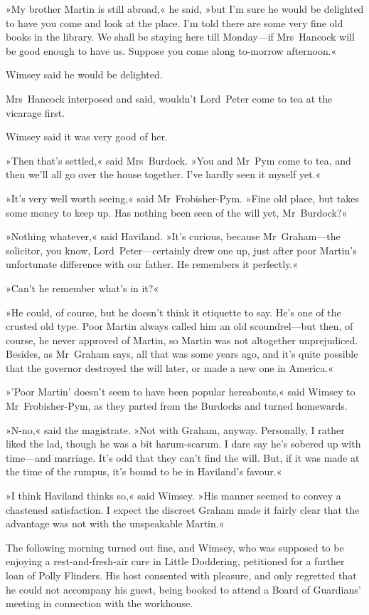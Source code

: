 »My brother Martin is still abroad,« he said, »but I'm sure he would be delighted to have you come and look at the place. I'm told there are some very fine old books in the library. We shall be staying here till Monday—if Mrs~Hancock will be good enough to have us. Suppose you come along to-morrow afternoon.«

Wimsey said he would be delighted.

Mrs~Hancock interposed and said, wouldn't Lord~Peter come to tea at the vicarage first.

Wimsey said it was very good of her.

»Then that's settled,« said Mrs~Burdock. »You and Mr~Pym come to tea, and then we'll all go over the house together. I've hardly seen it myself yet.«

»It's very well worth seeing,« said Mr~Frobisher-Pym. »Fine old place, but takes some money to keep up. Has nothing been seen of the will yet, Mr~Burdock?«

»Nothing whatever,« said Haviland. »It's curious, because Mr~Graham—the solicitor, you know, Lord~Peter—certainly drew one up, just after poor Martin's unfortunate difference with our father. He remembers it perfectly.«

»Can't he remember what's in it?«

»He could, of course, but he doesn't think it etiquette to say. He's one of the crusted old type. Poor Martin always called him an old scoundrel—but then, of course, he never approved of Martin, so Martin was not altogether unprejudiced. Besides, as Mr~Graham says, all that was some years ago, and it's quite possible that the governor destroyed the will later, or made a new one in America.«

»'Poor Martin' doesn't seem to have been popular hereabouts,« said Wimsey to Mr~Frobisher-Pym, as they parted from the Burdocks and turned homewards.

»N-no,« said the magistrate. »Not with Graham, anyway. Personally, I rather liked the lad, though he was a bit harum-scarum. I dare say he's sobered up with time—and marriage. It's odd that they can't find the will. But, if it was made at the time of the rumpus, it's bound to be in Haviland's favour.«

»I think Haviland thinks so,« said Wimsey. »His manner seemed to convey a chastened satisfaction. I expect the discreet Graham made it fairly clear that the advantage was not with the unspeakable Martin.«

The following morning turned out fine, and Wimsey, who was supposed to be enjoying a rest-and-fresh-air cure in Little Doddering, petitioned for a further loan of Polly Flinders. His host consented with pleasure, and only regretted that he could not accompany his guest, being booked to attend a Board of Guardians' meeting in connection with the workhouse.

